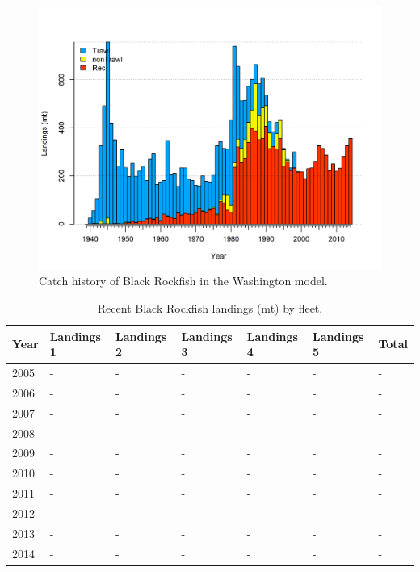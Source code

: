 \documentclass[12pt,]{article}
\begin{document}
\begin{figure}[htbp]
\centering
\includegraphics{r4ss/plots_mod3/catch2 landings stacked.png}
\caption{Catch history of Black Rockfish in the Washington model.
\label{fig:r4ss_catches3}}
\end{figure}

\begin{table}[ht]
\centering
\caption{Recent Black Rockfish landings (mt) by 
                                            fleet.} 
\label{tab:Exec_catch}
\begin{tabular}{l>{\centering}p{1in}>{\centering}p{1in}>{\centering}p{1in}>{\centering}p{.9in}>{\centering}p{.9in}>{\centering}p{.6in}}
  \hline
Year & Landings 1 & Landings 2 & Landings 3 & Landings 4 & Landings 5 & Total \\ 
  \hline
2005 & - & - & - & - & - & - \\ 
  2006 & - & - & - & - & - & - \\ 
  2007 & - & - & - & - & - & - \\ 
  2008 & - & - & - & - & - & - \\ 
  2009 & - & - & - & - & - & - \\ 
  2010 & - & - & - & - & - & - \\ 
  2011 & - & - & - & - & - & - \\ 
  2012 & - & - & - & - & - & - \\ 
  2013 & - & - & - & - & - & - \\ 
  2014 & - & - & - & - & - & - \\ 
   \hline
\end{tabular}
\end{table}
\end{document}
